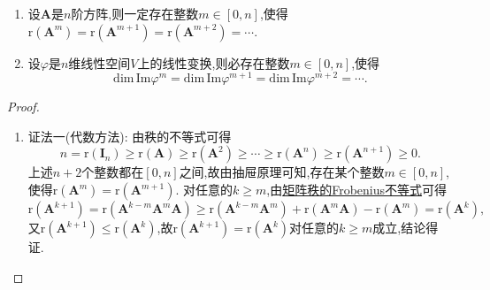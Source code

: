 \documentclass[../../main.tex]{subfiles}%
\begin{document}
\begin{corollary}\label{corollary:n次方幂秩/值域维数等式}
\begin{enumerate}[(1)]
\item 设\(\boldsymbol{A}\)是\(n\)阶方阵,则一定存在整数$m\in[0,n]$,使得\(\text{r}(\boldsymbol{A}^m)=\text{r}(\boldsymbol{A}^{m + 1})=\text{r}(\boldsymbol{A}^{m + 2})=\cdots\).

\item 设\(\varphi\)是\(n\)维线性空间\(V\)上的线性变换,则必存在整数\(m\in[0,n]\),使得
\[
\mathrm{dim}\,\mathrm{Im}\varphi ^m=\mathrm{dim}\,\mathrm{Im}\varphi ^{m+1}=\mathrm{dim}\,\mathrm{Im}\varphi ^{m+2}=\cdots.
\]
\end{enumerate}
\end{corollary}
\begin{proof}
\begin{enumerate}[(1)]
\item {\color{blue}证法一(代数方法):} 由秩的不等式可得
\[
n=\text{r}(\boldsymbol{I}_n)\geqslant \text{r}(\boldsymbol{A})\geqslant \text{r}(\boldsymbol{A}^2)\geqslant \cdots\geqslant \text{r}(\boldsymbol{A}^n)\geqslant \text{r}(\boldsymbol{A}^{n + 1})\geqslant  0.
\]
上述\(n + 2\)个整数都在\([0,n]\)之间,故由抽屉原理可知,存在某个整数\(m\in[0,n]\),使得\(\text{r}(\boldsymbol{A}^m)=\text{r}(\boldsymbol{A}^{m + 1})\). 对任意的\(k\geqslant  m\),由\hyperref[proposition:Frobenius(弗罗贝尼乌斯)不等式]{矩阵秩的Frobenius不等式}可得
\[
\text{r}(\boldsymbol{A}^{k + 1})=\text{r}(\boldsymbol{A}^{k - m}\boldsymbol{A}^m\boldsymbol{A})\geqslant \text{r}(\boldsymbol{A}^{k - m}\boldsymbol{A}^m)+\text{r}(\boldsymbol{A}^m\boldsymbol{A})-\text{r}(\boldsymbol{A}^m)=\text{r}(\boldsymbol{A}^k),
\]
又\(\text{r}(\boldsymbol{A}^{k + 1})\leqslant \text{r}(\boldsymbol{A}^k)\),故\(\text{r}(\boldsymbol{A}^{k + 1})=\text{r}(\boldsymbol{A}^k)\)对任意的\(k\geqslant  m\)成立,结论得证.


\end{enumerate}
\end{proof}
\end{document}
